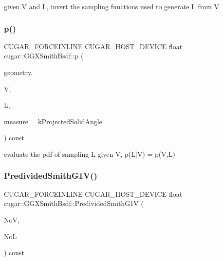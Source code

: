 given V and L, invert the sampling functions used to generate L from V \mbox{\label{structcugar_1_1_g_g_x_smith_bsdf_a8cc733f9120c3b196b54a8df79116dfc}} 
\subsubsection{\texorpdfstring{p()}{p()}}
{\footnotesize\ttfamily C\+U\+G\+A\+R\+\_\+\+F\+O\+R\+C\+E\+I\+N\+L\+I\+NE C\+U\+G\+A\+R\+\_\+\+H\+O\+S\+T\+\_\+\+D\+E\+V\+I\+CE float cugar\+::\+G\+G\+X\+Smith\+Bsdf\+::p (\begin{DoxyParamCaption}\item[{const \hyperlink{structcugar_1_1_differential_geometry}{Differential\+Geometry} \&}]{geometry,  }\item[{const \hyperlink{structcugar_1_1_vector}{Vector3f}}]{V,  }\item[{const \hyperlink{structcugar_1_1_vector}{Vector3f}}]{L,  }\item[{const Spherical\+Measure}]{measure = {\ttfamily kProjectedSolidAngle} }\end{DoxyParamCaption}) const\hspace{0.3cm}{\ttfamily [inline]}}

evaluate the pdf of sampling L given V, p(L$\vert$V) = p(\+V,\+L) \mbox{\label{structcugar_1_1_g_g_x_smith_bsdf_a752c827c820f94e92232e95b7a2773b1}} 
\subsubsection{\texorpdfstring{Predivided\+Smith\+G1\+V()}{PredividedSmithG1V()}}
{\footnotesize\ttfamily C\+U\+G\+A\+R\+\_\+\+F\+O\+R\+C\+E\+I\+N\+L\+I\+NE C\+U\+G\+A\+R\+\_\+\+H\+O\+S\+T\+\_\+\+D\+E\+V\+I\+CE float cugar\+::\+G\+G\+X\+Smith\+Bsdf\+::\+Predivided\+Smith\+G1V (\begin{DoxyParamCaption}\item[{const float}]{NoV,  }\item[{const float}]{NoL }\end{DoxyParamCaption}) const\hspace{0.3cm}{\ttfamily [inline]}}


